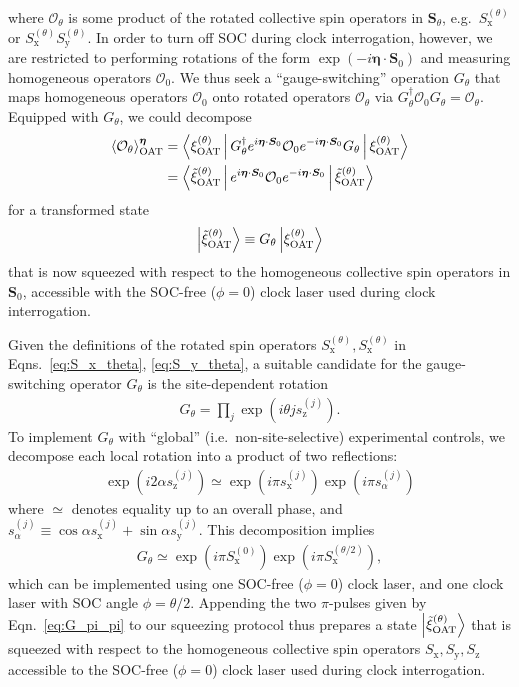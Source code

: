 \documentclass[aps,prx,superscriptaddress,notitlepage,twocolumn,longbibliography]{revtex4-2}
\renewcommand{\t}{\text} %
\newcommand{\p}[1]{\left(#1\right)} %
\renewcommand{\c}{\cdot} %
\renewcommand{\v}{\bm} %
\newcommand{\bk}{\Braket}
\renewcommand{\ket}{\Ket}
\renewcommand{\O}{\mathcal{O}}
\newcommand{\z}{\text{z}}
\newcommand{\x}{\text{x}}
\newcommand{\y}{\text{y}}
\begin{document}
where $\O_\theta$ is some product of the rotated collective spin operators in $\v S_\theta$, e.g.~$S_\x^{(\theta)}$ or $S_\x^{(\theta)} S_\y^{(\theta)}$.
In order to turn off SOC during clock interrogation, however, we are restricted to performing rotations of the form $\exp\p{-i\v\eta\c\v S_0}$ and measuring homogeneous operators $\O_0$.
We thus seek a ``gauge-switching'' operation $G_\theta$ that maps homogeneous operators $\O_0$ onto rotated operators $\O_\theta$ via $G_\theta^\dag \O_0 G_\theta = \O_\theta$.
Equipped with $G_\theta$, we could decompose
\begin{align}
  \bk{\O_\theta}_{\t{OAT}}^{\v\eta}
  &= \bk{\xi_{\t{OAT}}^{(\theta)}| G_\theta^\dag e^{i\v\eta\c\v S_0}
    \O_0 e^{-i\v\eta\c\v S_0} G_\theta |\xi_{\t{OAT}}^{(\theta)}}
  \notag \\
  &= \bk{\tilde \xi_{\t{OAT}}^{(\theta)}| e^{i\v\eta\c\v S_0}
    \O_0 e^{-i\v\eta\c\v S_0} |\tilde \xi_{\t{OAT}}^{(\theta)}}
\end{align}
for a transformed state
\begin{align}
  \ket{\tilde \xi_{\t{OAT}}^{(\theta)}}
  \equiv G_\theta \ket{\xi_{\t{OAT}}^{(\theta)}}
\end{align}
that is now squeezed with respect to the homogeneous collective spin operators in $\v S_0$, accessible with the SOC-free ($\phi=0$) clock laser used during clock interrogation.

Given the definitions of the rotated spin operators $S_\x^{(\theta)},S_\x^{(\theta)}$ in Eqns.~\eqref{eq:S_x_theta}, \eqref{eq:S_y_theta}, a suitable candidate for the gauge-switching operator $G_\theta$ is the site-dependent rotation
\begin{align}
  G_\theta = \prod_j \exp\p{i\theta j s_\z^{(j)}}.
\end{align}
To implement $G_\theta$ with ``global'' (i.e.~non-site-selective) experimental controls, we decompose each local rotation into a product of two reflections:
\begin{align}
  \exp\p{i2\alpha s_\z^{(j)}}
  \simeq \exp\p{i\pi s_\x^{(j)}} \exp\p{i\pi s_\alpha^{(j)}}
\end{align}
where $\simeq$ denotes equality up to an overall phase, and $s_\alpha^{(j)} \equiv \cos\alpha s_\x^{(j)} + \sin\alpha s_\y^{(j)}$.
This decomposition implies
\begin{align}
  G_\theta \simeq \exp\p{i\pi S_\x^{(0)}} \exp\p{i\pi S_\x^{(\theta/2)}},
  \label{eq:G_pi_pi}
\end{align}
which can be implemented using one SOC-free ($\phi=0$) clock laser, and one clock laser with SOC angle $\phi=\theta/2$.
Appending the two $\pi$-pulses given by Eqn.~\eqref{eq:G_pi_pi} to our squeezing protocol thus prepares a state $\ket{\tilde\xi_{\t{OAT}}^{(\theta)}}$ that is squeezed with respect to the homogeneous collective spin operators $S_\x,S_\y,S_\z$ accessible to the SOC-free ($\phi=0$) clock laser used during clock interrogation.
\end{document}
